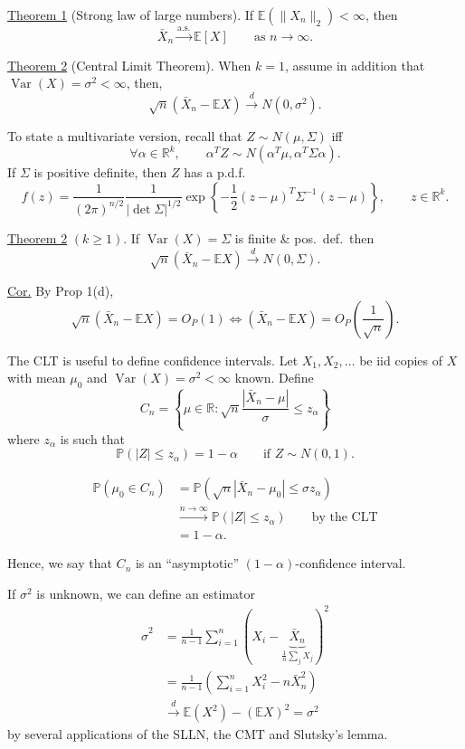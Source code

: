 \documentclass[11pt,a4paper]{article}
\begin{document}
\medskip
\noindent
\underline{Theorem 1} (Strong law of large numbers).
If $\mathbb{E}\left(\|X_n\|_2\right)<\infty$, then
\[
\bar{X}_n\xrightarrow{\mathrm{a.s.}}\mathbb{E}[X]
\qquad\text{as }n\to\infty.
\]

\medskip
\noindent
\underline{Theorem 2} (Central Limit Theorem).
When $k=1$, assume in addition that
$\operatorname{Var}(X)=\sigma^2<\infty$, then,
\[
\sqrt{n}\left(\bar{X}_n-\mathbb{E}X\right)
\xrightarrow{d}N(0,\sigma^2).
\]

\noindent
To state a multivariate version, recall that
$Z\sim N(\mu,\Sigma)$ iff
\[
\forall\alpha\in\mathbb{R}^k,\qquad
\alpha^T Z\sim N(\alpha^T\mu,\alpha^T\Sigma\alpha).
\]
If $\Sigma$ is positive definite, then $Z$ has a p.d.f.
\[
f(z)
=
\frac{1}{(2\pi)^{n/2}}
\frac{1}{|\det\Sigma|^{1/2}}
\exp\left\{
-\frac{1}{2}(z-\mu)^T\Sigma^{-1}(z-\mu)
\right\},
\qquad z\in\mathbb{R}^k.
\]

\medskip
\noindent
\underline{Theorem 2} $(k\geq1)$.
If $\operatorname{Var}(X)=\Sigma$ is finite \& pos.\ def.\ then
\[
\sqrt{n}\left(\bar{X}_n-\mathbb{E}X\right)
\xrightarrow{d}N(0,\Sigma).
\]

\medskip
\noindent
\underline{Cor.}
By Prop 1(d),
\[
\sqrt{n}\left(\bar{X}_n-\mathbb{E}X\right)=O_P(1)
\iff
\left(\bar{X}_n-\mathbb{E}X\right)
=
O_P\left(\frac{1}{\sqrt{n}}\right).
\]

\medskip
\noindent
The CLT is useful to define confidence intervals.
Let $X_1,X_2,\ldots$ be iid copies of $X$ with mean $\mu_0$
and $\operatorname{Var}(X)=\sigma^2<\infty$ known.
Define
\[
C_n
=
\left\{
\mu\in\mathbb{R}:
\sqrt{n}\frac{|\bar{X}_n-\mu|}{\sigma}
\leq z_\alpha
\right\}
\]
where $z_\alpha$ is such that
\[
\mathbb{P}(|Z|\leq z_\alpha)=1-\alpha
\qquad\text{if }Z\sim N(0,1).
\]

\[
\begin{aligned}
\mathbb{P}(\mu_0\in C_n)
&=
\mathbb{P}\left(
\sqrt{n}|\bar{X}_n-\mu_0|\leq\sigma z_\alpha
\right)\\
&\xrightarrow{n\to\infty}
\mathbb{P}(|Z|\leq z_\alpha)
\qquad\text{by the CLT}\\
&=1-\alpha.
\end{aligned}
\]

\noindent
Hence, we say that $C_n$ is an ``asymptotic''
$(1-\alpha)$-confidence interval.

\medskip
\noindent
If $\sigma^2$ is unknown, we can define an estimator
\[
\begin{aligned}
\hat{\sigma}^2
&=
\frac{1}{n-1}
\sum_{i=1}^n
\left(
X_i-\underbrace{\bar{X}_n}_{\frac{1}{n}\sum_j X_j}
\right)^2\\
&=
\frac{1}{n-1}
\left(
\sum_{i=1}^n X_i^2-n\bar{X}_n^2
\right)\\
&\xrightarrow{d}
\mathbb{E}(X^2)-(\mathbb{E}X)^2
=
\sigma^2
\end{aligned}
\]
by several applications of the SLLN, the CMT and Slutsky's lemma.
\end{document}
